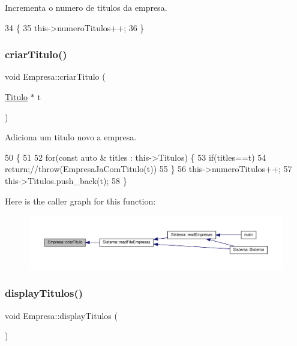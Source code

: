 Incrementa o numero de titulos da empresa. 


\begin{DoxyCode}
34                         \{
35     this->numeroTitulos++;
36 \}
\end{DoxyCode}
\mbox{\label{classEmpresa_a3c6eb96c694dcb6db1e402d6db1c439a}} 
\subsubsection{\texorpdfstring{criar\+Titulo()}{criarTitulo()}}
{\footnotesize\ttfamily void Empresa\+::criar\+Titulo (\begin{DoxyParamCaption}\item[{\hyperlink{classTitulo}{Titulo} $\ast$}]{t }\end{DoxyParamCaption})}



Adiciona um titulo novo a empresa. 


\begin{DoxyCode}
50                                     \{
51 
52     \textcolor{keywordflow}{for}(\textcolor{keyword}{const} \textcolor{keyword}{auto} & titles : this->Titulos) \{
53         \textcolor{keywordflow}{if}(titles==t)
54             \textcolor{keywordflow}{return};\textcolor{comment}{//throw(EmpresaJaComTitulo(t))}
55     \}
56     this->numeroTitulos++;
57     this->Titulos.push\_back(t);
58 \}
\end{DoxyCode}
Here is the caller graph for this function\+:
\nopagebreak
\begin{figure}[H]
\begin{center}
\leavevmode
\includegraphics[width=350pt]{classEmpresa_a3c6eb96c694dcb6db1e402d6db1c439a_icgraph}
\end{center}
\end{figure}
\mbox{\label{classEmpresa_af067f4d00a5ceb8816a607164916d2e1}} 
\subsubsection{\texorpdfstring{display\+Titulos()}{displayTitulos()}}
{\footnotesize\ttfamily void Empresa\+::display\+Titulos (\begin{DoxyParamCaption}{ }\end{DoxyParamCaption})}



